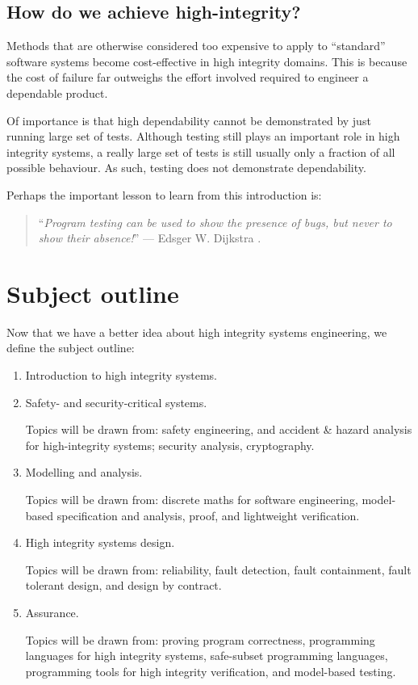 \subsection*{How do we achieve high-integrity?}

Methods that are otherwise considered too expensive to apply to ``standard'' software systems become cost-effective in high integrity domains. This is because the cost of failure far outweighs the effort involved required to engineer a dependable product.

Of importance is that high dependability cannot be demonstrated by just running large set of tests. Although testing still plays an important role in high integrity systems, a really large set of tests is still usually only a fraction of all possible behaviour. As such, testing does not demonstrate dependability.

Perhaps the important lesson to learn from this introduction is:

\begin{quote}
``\emph{Program testing can be used to show the presence of bugs, but never to show their absence!}'' --- Edsger W. Dijkstra \cite{dijkstra1970notes}.
\end{quote}


\section{Subject outline}

Now that we have a better idea about high integrity systems engineering, we define the subject outline:

\begin{enumerate}[\bf {Part} I:]

 \item Introduction to high integrity systems.

 \item Safety- and security-critical systems.

   Topics will be drawn from: safety engineering, and accident \& hazard analysis for high-integrity systems; security analysis, cryptography.

 \item  Modelling and analysis.

  Topics will be drawn from: discrete maths for software engineering, model-based specification and analysis, proof, and lightweight verification.

 \item High integrity systems design.

  Topics will be drawn from: reliability, fault detection, fault containment, fault tolerant design, and design by contract.

 \item Assurance.

  Topics will be drawn from: proving program correctness, programming languages for high integrity systems, safe-subset programming languages, programming tools for high integrity verification, and   model-based testing.

\end{enumerate}

